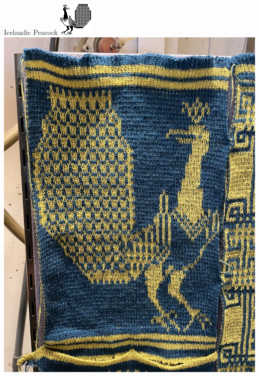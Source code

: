 \documentclass[
    NAME={Dr. Helga Ingimundardóttir},
    EMAIL={helgaingim@hi.is},
    FACULTY={Industrial Engineering},
    TITLE={HiDef Textiles: Reviving Tradition with Innovation},
    SUBTITLE={Empowering Creativity and Sustainability in Textile Production through Digital Transformation},
    SEMINAR={Reykjavík DataBeers},
    DATE={January 25, 2025},
    WIDE={true}
]{HI-LaTeX/hi-beamer}
\begin{document}
    \begin{frame}{Icelandic Peacock}
        \centering
        \href{https://www.instagram.com/p/C9Cf8FFgDZZ/}{
            \includegraphics[height=.7\textheight]{include/thjms5898_246_0.png}
            \hspace{24pt}
            \includegraphics[height=.7\textheight]{include/peacock.jpg}}
    \end{frame}
\end{document}

